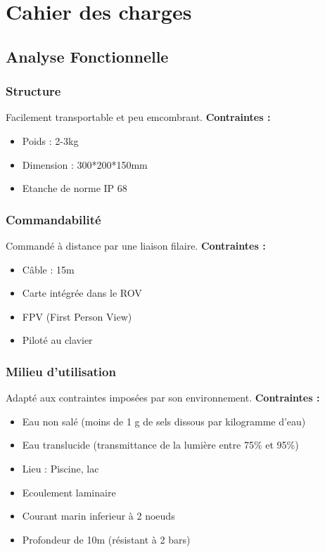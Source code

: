 \documentclass[a4paper,11pt]{report}
\begin{document}
				
\chapter{Cahier des charges}

        \section{Analyse Fonctionnelle}
						\subsection{Structure}
								Facilement transportable et peu emcombrant.\newline
								\textbf{Contraintes :}
								\begin{itemize}
										\item Poids : 2-3kg
										\item Dimension : 300*200*150mm
										\item Etanche de norme IP 68 \newline \newline
									\end{itemize}

						\subsection{Commandabilité}
								Commandé à distance par une liaison filaire.\newline
								\textbf{Contraintes :}
								\begin{itemize}
										\item Câble : 15m
										\item Carte intégrée dans le ROV
										\item FPV (First Person View)
										\item Piloté au clavier\newline \newline
								\end{itemize}

						\subsection{Milieu d'utilisation}
								Adapté aux contraintes imposées par son environnement. \newline
								\textbf{Contraintes :}
								\begin{itemize}
										\item Eau non salé (moins de 1 g de sels dissous par kilogramme d'eau)
										\item Eau translucide (transmittance de la lumière entre 75\% et 95\%)
										\item Lieu : Piscine, lac
										\item Ecoulement laminaire
										\item Courant marin inferieur à 2 noeuds
										\item Profondeur de 10m (résistant à 2 bars) \newline \newline
								\end{itemize}
\end{document}
